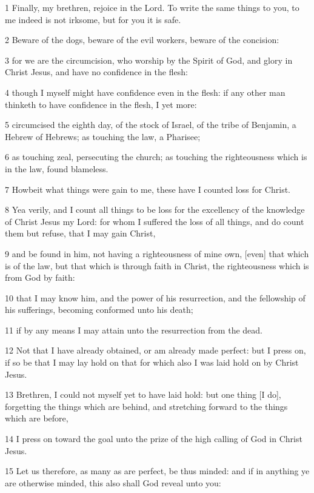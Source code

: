 \par 1 Finally, my brethren, rejoice in the Lord. To write the same things to you, to me indeed is not irksome, but for you it is safe.
\par 2 Beware of the dogs, beware of the evil workers, beware of the concision:
\par 3 for we are the circumcision, who worship by the Spirit of God, and glory in Christ Jesus, and have no confidence in the flesh:
\par 4 though I myself might have confidence even in the flesh: if any other man thinketh to have confidence in the flesh, I yet more:
\par 5 circumcised the eighth day, of the stock of Israel, of the tribe of Benjamin, a Hebrew of Hebrews; as touching the law, a Pharisee;
\par 6 as touching zeal, persecuting the church; as touching the righteousness which is in the law, found blameless.
\par 7 Howbeit what things were gain to me, these have I counted loss for Christ.
\par 8 Yea verily, and I count all things to be loss for the excellency of the knowledge of Christ Jesus my Lord: for whom I suffered the loss of all things, and do count them but refuse, that I may gain Christ,
\par 9 and be found in him, not having a righteousness of mine own, [even] that which is of the law, but that which is through faith in Christ, the righteousness which is from God by faith:
\par 10 that I may know him, and the power of his resurrection, and the fellowship of his sufferings, becoming conformed unto his death;
\par 11 if by any means I may attain unto the resurrection from the dead.
\par 12 Not that I have already obtained, or am already made perfect: but I press on, if so be that I may lay hold on that for which also I was laid hold on by Christ Jesus.
\par 13 Brethren, I could not myself yet to have laid hold: but one thing [I do], forgetting the things which are behind, and stretching forward to the things which are before,
\par 14 I press on toward the goal unto the prize of the high calling of God in Christ Jesus.
\par 15 Let us therefore, as many as are perfect, be thus minded: and if in anything ye are otherwise minded, this also shall God reveal unto you:
